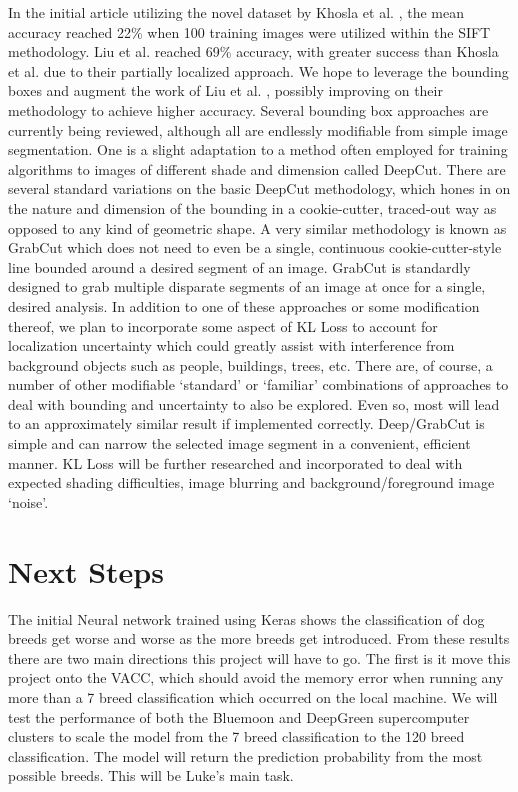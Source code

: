 \documentclass[12pt]{article}
\begin{document}
In the initial article utilizing the novel dataset by Khosla et al. \cite{khosla2011novel}, the mean accuracy reached 22\% when 100 training images were utilized within the SIFT methodology. Liu et al. \cite{liu2012dog} reached 69\% accuracy, with greater success than Khosla et al. \cite{khosla2011novel} due to their partially localized approach.  We hope to leverage the bounding boxes and augment the work of Liu et al. \cite{liu2012dog}, possibly improving on their methodology to achieve higher accuracy. Several bounding box approaches are currently being reviewed, although all are endlessly modifiable from simple image segmentation. One is a slight adaptation to a method often employed for training algorithms to images of different shade and dimension called DeepCut.  \cite{rajchl2016deepcut} There are several standard variations on the basic DeepCut methodology, which hones in on the nature and dimension of the bounding in a cookie-cutter, traced-out way as opposed to any kind of geometric shape. A very similar methodology is known as GrabCut which does not need to even be a single, continuous cookie-cutter-style line bounded around a desired segment of an image. GrabCut is standardly designed to grab multiple disparate segments of an image at once for a single, desired analysis. In addition to one of these approaches or some modification thereof, we plan to incorporate some aspect of KL Loss to account for localization uncertainty which could greatly assist with interference from background objects such as people, buildings, trees, etc. \cite{he2019bounding} There are, of course, a number of other modifiable ‘standard’ or ‘familiar’ combinations of approaches to deal with bounding and uncertainty to also be explored. Even so, most will lead to an approximately similar result if implemented correctly. Deep/GrabCut is simple and can narrow the selected image segment in a convenient, efficient manner. KL Loss will be further researched and incorporated to deal with expected shading difficulties, image blurring and background/foreground image ‘noise’.

\section{Next Steps}

The initial Neural network trained using Keras shows the classification of dog breeds get worse and worse as the more breeds get introduced.  From these results there are two main directions this project will have to go.  The first is it move this project onto the VACC, which should avoid the memory error when running any more than a 7 breed classification which occurred on the local machine.  We will test the performance of both the Bluemoon and DeepGreen supercomputer clusters to scale the model  from the 7 breed classification to the 120 breed classification.  The model will return the prediction probability from the most possible breeds. This will be Luke's main task.
\end{document}

